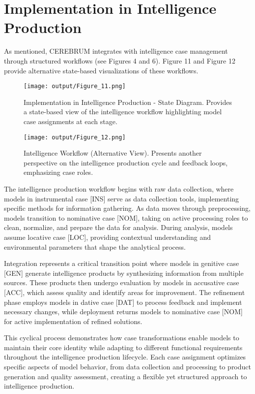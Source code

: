 \hypertarget{implementation-in-intelligence-production}{%
\section{Implementation in Intelligence
Production}\label{implementation-in-intelligence-production}}

As mentioned, CEREBRUM integrates with intelligence case management
through structured workflows (see Figures 4 and 6). Figure 11 and Figure
12 provide alternative state-based visualizations of these workflows.

\begin{figure}
\centering
\texttt{[image: output/Figure\_11.png]}
\caption{Implementation in Intelligence Production - State Diagram.
Provides a state-based view of the intelligence workflow highlighting
model case assignments at each stage.}
\end{figure}

\begin{figure}
\centering
\texttt{[image: output/Figure\_12.png]}
\caption{Intelligence Workflow (Alternative View). Presents another
perspective on the intelligence production cycle and feedback loops,
emphasizing case roles.}
\end{figure}

The intelligence production workflow begins with raw data collection,
where models in instrumental case {[}INS{]} serve as data collection
tools, implementing specific methods for information gathering. As data
moves through preprocessing, models transition to nominative case
{[}NOM{]}, taking on active processing roles to clean, normalize, and
prepare the data for analysis. During analysis, models assume locative
case {[}LOC{]}, providing contextual understanding and environmental
parameters that shape the analytical process.

Integration represents a critical transition point where models in
genitive case {[}GEN{]} generate intelligence products by synthesizing
information from multiple sources. These products then undergo
evaluation by models in accusative case {[}ACC{]}, which assess quality
and identify areas for improvement. The refinement phase employs models
in dative case {[}DAT{]} to process feedback and implement necessary
changes, while deployment returns models to nominative case {[}NOM{]}
for active implementation of refined solutions.

This cyclical process demonstrates how case transformations enable
models to maintain their core identity while adapting to different
functional requirements throughout the intelligence production
lifecycle. Each case assignment optimizes specific aspects of model
behavior, from data collection and processing to product generation and
quality assessment, creating a flexible yet structured approach to
intelligence production.

